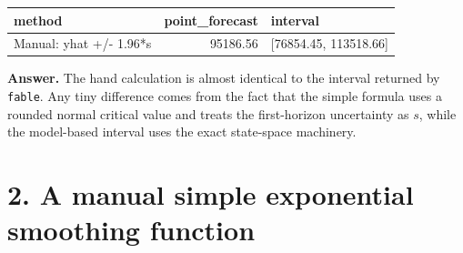 \documentclass[
  11pt,
]{article}
\newcounter{none} %
\begin{document}
{\def\LTcaptype{none} %
\begin{longtable}[]{@{}lrl@{}}
\toprule\noalign{}
method & point\_forecast & interval \\
\midrule\noalign{}
\endhead
\bottomrule\noalign{}
\endlastfoot
Manual: yhat +/- 1.96*s & 95186.56 & {[}76854.45, 113518.66{]} \\
\end{longtable}
}

\textbf{Answer.} The hand calculation is almost identical to the
interval returned by \texttt{fable}. Any tiny difference comes from the
fact that the simple formula uses a rounded normal critical value and
treats the first-horizon uncertainty as \(s\), while the model-based
interval uses the exact state-space machinery.

\section{2. A manual simple exponential smoothing
function}\label{a-manual-simple-exponential-smoothing-function}
\end{document}

